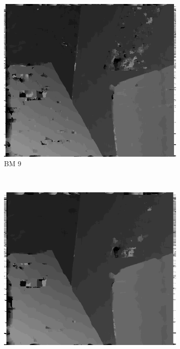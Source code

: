 \begin{figure}

  \begin{subfigure}[b]{0.23\textwidth}
    \centering
    \includegraphics[width=\textwidth]{images/stereo-pairs/venus_bm_9.png}
    \caption{BM 9}
  \end{subfigure}
  ~
  \begin{subfigure}[b]{0.23\textwidth}
    \centering
    \includegraphics[width=\textwidth]{images/stereo-pairs/venus_bm_13.png}

\end{subfigure}
\end{figure}
